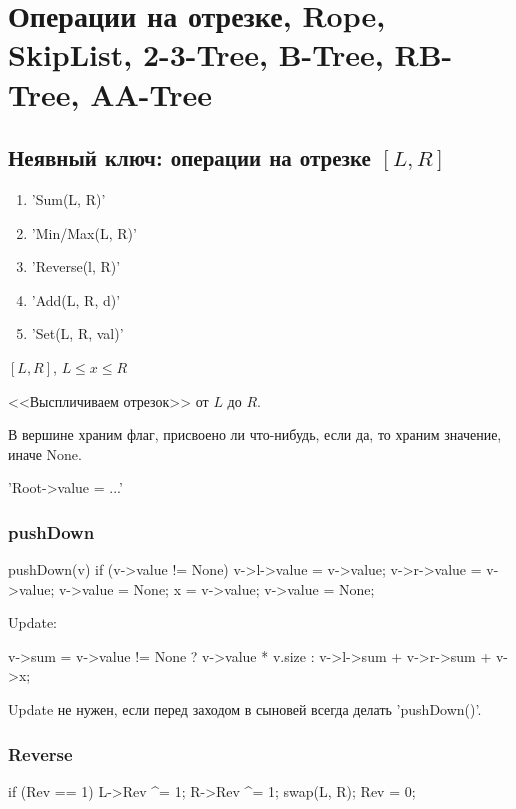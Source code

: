 \chapter{Операции на отрезке, Rope, SkipList, 2-3-Tree, B-Tree, RB-Tree, AA-Tree}

\section{Неявный ключ: операции на отрезке \texorpdfstring{$[L, R]$}{[L, R]}}

\begin{enumerate}
	\item \cpp'Sum(L, R)'
	\item \cpp'Min/Max(L, R)'
	\item \cpp'Reverse(l, R)'
	\item \cpp'Add(L, R, d)'
	\item \cpp'Set(L, R, val)'
\end{enumerate}

$[L, R]$, $L \le x \le R$

<<Выспличиваем отрезок>> от $L$ до $R$.

В вершине храним флаг, присвоено ли что-нибудь, если да, то храним значение, иначе None.

\cpp'Root->value = ...'

\subsection{pushDown}
\begin{cppcode}
pushDown(v)
{
	if (v->value != None)
	{
		v->l->value = v->value;
		v->r->value = v->value;
		v->value = None;
		x = v->value;
		v->value = None;
	}
}
\end{cppcode}

Update:
\begin{cppcode}
	v->sum = v->value != None ? v->value * v.size :
	v->l->sum + v->r->sum + v->x;
\end{cppcode}

\begin{Rem}
	Update не нужен, если перед заходом в сыновей всегда делать \cpp'pushDown()'.
\end{Rem}

\subsection{Reverse}
\begin{cppcode}
if (Rev == 1)
{
	L->Rev ^= 1;
	R->Rev ^= 1;
	swap(L, R);
	Rev = 0;
}
\end{cppcode}

